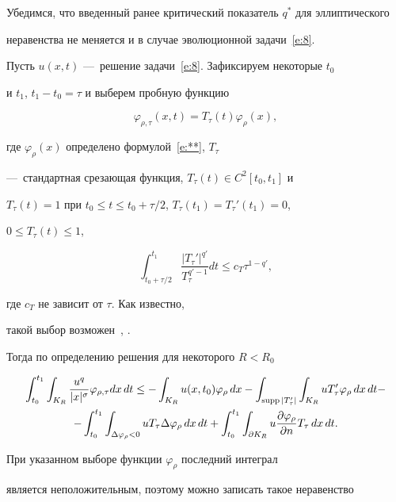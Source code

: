 Убедимся, что введенный ранее критический показатель $q^*$ для эллиптического


неравенства не меняется и в случае эволюционной задачи~\eqref{e:8}.





Пусть $u(x,t)$ ---~решение задачи~\eqref{e:8}. Зафиксируем некоторые $t_0$


и $t_1$, $t_1-t_0=\tau$ и выберем пробную функцию


$$


\varphi_{\rho,\tau}(x,t)=T_\tau(t)\varphi_\rho(x),


$$


где $\varphi_\rho(x)$ определено формулой~\eqref{e:**}, $T_\tau$


---~стандартная срезающая функция, $T_\tau(t)\in C^2[t_0,t_1]$ и


$T_\tau(t)=1$ при $t_0\le t\le t_0+\tau/2$, $T_\tau(t_1)=T_\tau'(t_1)=0$,


$0\le T_\tau(t)\le1$,


$$


\int_{t_0+\tau/2}^{t_1}\frac{|T_\tau'|^{q'}}{T_\tau^{q'-1}}dt\le


c_T\tau^{1-q'},


$$


где $c_T$ не зависит от $\tau$. Как известно, 


такой выбор возможен~\cite{K2}, \cite{MP1}.





Тогда по определению решения для некоторого $R<R_0$


\begin{multline*}


\int_{t_0}^{t_1}\int_{K_R}\frac{u^q}{|x|^\sigma}\varphi_{\rho,\tau}dx\,dt\le


-\int_{K_R} u(x,t_0)\varphi_\rho\,dx-\int_{\supp|T_\tau'|}\int_{K_R}


uT_\tau'\varphi_\rho\,dx\,dt-\\


-\int_{t_0}^{t_1}\int_{\Delta\varphi_\rho<0}uT_\tau\Delta\varphi_\rho\,dx\,dt+


\int_{t_0}^{t_1}\int_{\p K_R}u\frac{\p\varphi_\rho}{\p n}T_\tau\,dx\,dt.


\end{multline*}


При указанном выборе функции $\varphi_\rho$ последний интеграл


является неположительным, поэтому можно записать такое неравенство


